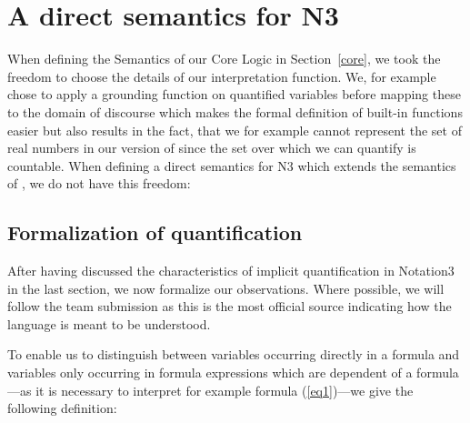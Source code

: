 \section{A direct semantics for N3}

When defining the Semantics of our Core Logic in Section~\ref{core}, we took the freedom to choose the details of our interpretation function. We, for example
chose to apply a grounding function on quantified variables before mapping these to the domain of discourse which makes the formal 
definition of built-in functions easier but also results in the fact, that we for example cannot represent the set of real numbers in
our version of \nthree since the set over which we can quantify is countable. When defining a direct semantics for N3 which extends the semantics of \rdf, we do not have this freedom:



\subsection{Formalization of quantification}\label{formal}
After having discussed the characteristics of implicit quantification in Notation3 in the last section, we now formalize our observations. 
Where possible, we will follow the team submission \cite{Notation3} as this is the most official source indicating how the language is meant to be understood.

To enable us to distinguish between variables occurring directly in a formula and variables only occurring in formula expressions which are dependent of a formula---as 
it is necessary to interpret for example formula (\ref{eq1})---we give the following definition: 




